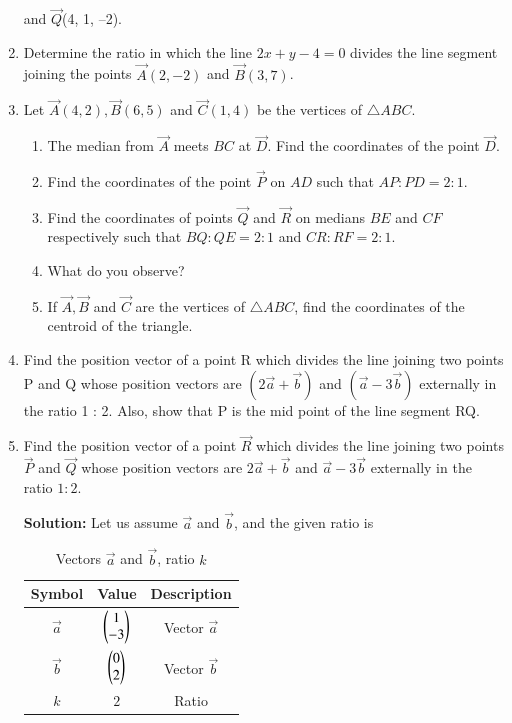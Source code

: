\begin{enumerate}[label=\thesubsection.\arabic*,ref=\thesubsection.\theenumi]
and $\vec{Q}$(4, 1, –2).
\\
\solution
		
\item Determine the ratio in which the line $2x+y  - 4=0$ divides the line segment joining the points $\vec{A}(2, - 2)$  and  $\vec{B}(3, 7)$.
\\
\solution
	
\item Let $\vec{A}(4, 2), \vec{B}(6, 5)$  and $ \vec{C}(1, 4)$ be the vertices of $\triangle ABC$.
\begin{enumerate}
\item The median from $\vec{A}$ meets $BC$ at $\vec{D}$. Find the coordinates of the point $\vec{D}$.
\item Find the coordinates of the point $\vec{P}$ on $AD$ such that $AP : PD = 2 : 1$.
\item Find the coordinates of points $\vec{Q}$ and $\vec{R}$ on medians $BE$ and $CF$ respectively such that $BQ : QE = 2 : 1$  and  $CR : RF = 2 : 1$.
\item What do you observe?
\item If $\vec{A}, \vec{B}$ and $\vec{C}$  are the vertices of $\triangle ABC$, find the coordinates of the centroid of the triangle.
\end{enumerate}
\solution
	
\item Find the position vector of a point R which divides the line joining two points P and Q whose position vectors are $(2\vec{a}+\vec{b})$ and $(\vec{a}-3\vec{b})$
externally in the ratio 1 : 2. Also, show that P is the mid point of the line segment RQ.\\
	\solution
		
\item Find the position vector of a point $\vec{R}$ which divides the line joining two points $\vec{P}$ and $\vec{Q}$ whose position vectors are $2\vec{a}+\vec{b}$ and $\vec{a}-3\vec{b}$ externally in the ratio $1:2$.

\textbf{Solution:}
Let us assume $\vec{a}$ and $\vec{b}$, and the given ratio is
\begin{table}[!ht]
    \centering
    \begin{tabular}{|c|c|c|}
        \hline
        \textbf{Symbol} & \textbf{Value} & \textbf{Description} \\
        \hline
        $\vec{a}$ & $\begin{pmatrix}1 \\ -3\end{pmatrix}$ & Vector $\vec{a}$ \\
        \hline
        $\vec{b}$ & $\begin{pmatrix}0 \\ 2\end{pmatrix}$ & Vector $\vec{b}$\\
        \hline
        $k$ & $2$ & Ratio \\
        \hline
    \end{tabular}
    \caption{Vectors $\vec{a}$ and $\vec{b}$, ratio $k$}
    \label{tab:table1}
\end{table}


\end{enumerate}
